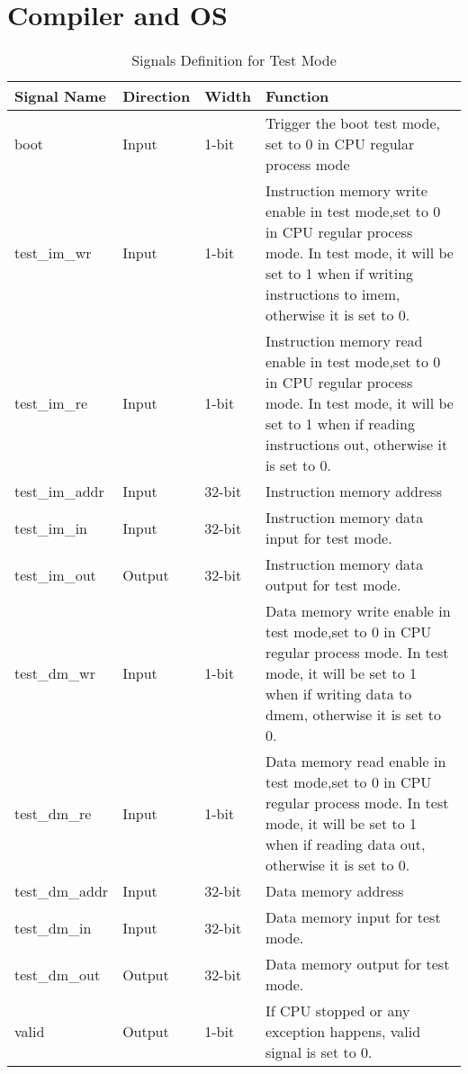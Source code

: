 \documentclass[a4paper]{article}
\begin{document}

\newpage
\section{Compiler and OS} \label{sec:CompileOS}%


\begin{table}[htp]
\caption{Signals Definition for Test Mode}\label{tab:signaldef}
\begin{center}
	\begin{tabular}{|l|l|l|p{6cm}|}
	\hline
	\textbf{Signal Name} & \textbf{Direction} & \textbf{Width} & \textbf{Function}\\ \hline \hline
	boot			& Input 	& 1-bit	& Trigger the boot test mode, 
									  set to 0 in CPU regular process mode\\ \hline
	test\_im\_wr 	& Input	& 1-bit	& Instruction memory write enable in test mode,set to 0 in 	
								  CPU regular process mode. In test mode, it will be set to 1 when if writing instructions to imem, otherwise it is set to 0.\\ \hline
	test\_im\_re 	& Input & 1-bit & Instruction memory read enable in test mode,set to 0 in 	
								  CPU regular process mode. In test mode, it will be set to 1 when if reading instructions out, otherwise it is set to 0. \\ \hline
	test\_im\_addr 	& Input & 32-bit& Instruction memory address\\ \hline
	test\_im\_in 	& Input & 32-bit& Instruction memory data input for test mode. \\ \hline
	test\_im\_out 	& Output& 32-bit& Instruction memory data output for test mode. \\ \hline
	test\_dm\_wr 	& Input	& 1-bit	& Data memory write enable in test mode,set to 0 in 	
								  CPU regular process mode. In test mode, it will be set to 1 when if writing data to dmem, otherwise it is set to 0.\\ \hline
	test\_dm\_re 	& Input & 1-bit & Data memory read enable in test mode,set to 0 in 	
								  CPU regular process mode. In test mode, it will be set to 1 when if reading data out, otherwise it is set to 0.\\ \hline
	test\_dm\_addr 	& Input & 32-bit& Data memory address\\ \hline
	test\_dm\_in 	& Input & 32-bit& Data memory input for test mode. \\ \hline
	test\_dm\_out 	& Output& 32-bit& Data memory output for test mode. \\ \hline
	valid			& Output& 1-bit & If CPU stopped or any exception happens, valid signal is set to 0.\\ 
	\hline
	\end{tabular}
\end{center}
\end{table}
\end{document}
